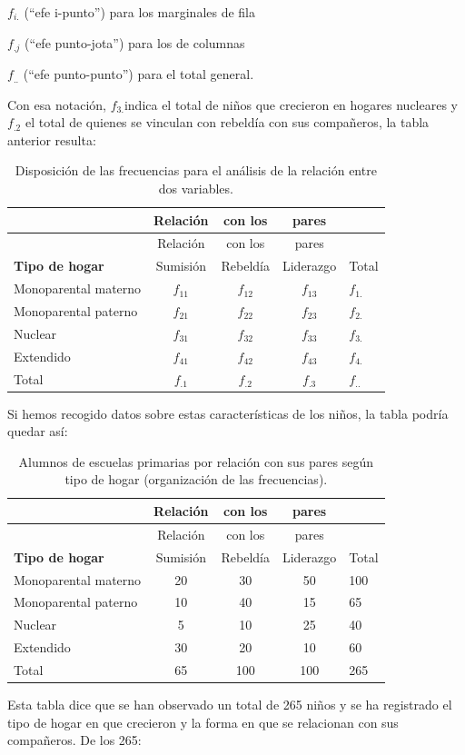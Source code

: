 \documentclass[]{book}
\begin{document}
\(f_{i.}\) (``efe i-punto'') para los marginales de fila

\(f_{.j}\) (``efe punto-jota'') para los de columnas

\(f_{..}\) (``efe punto-punto'') para el total general.

Con esa notación, \(f_{3.}\)indica el total de niños que crecieron en
hogares nucleares y \(f_{.2}\) el total de quienes se vinculan con rebeldía con sus compañeros, la tabla anterior resulta:

\begin{longtable}[]{@{}lcccl@{}}
\caption{\label{tab:unnamed-chunk-122}Disposición de las frecuencias para el análisis de la relación entre dos variables.}\tabularnewline
\toprule
& Relación & con los & pares &\tabularnewline
\midrule
\endfirsthead
\toprule
& Relación & con los & pares &\tabularnewline
\midrule
\endhead
\textbf{Tipo de hogar} & Sumisión & Rebeldía & Liderazgo & Total\tabularnewline
Monoparental materno & \(f_{11}\) & \(f_{12}\) & \(f_{13}\) & \(f_{1.}\)\tabularnewline
Monoparental paterno & \(f_{21}\) & \(f_{22}\) & \(f_{23}\) & \(f_{2.}\)\tabularnewline
Nuclear & \(f_{31}\) & \(f_{32}\) & \(f_{33}\) & \(f_{3.}\)\tabularnewline
Extendido & \(f_{41}\) & \(f_{42}\) & \(f_{43}\) & \(f_{4.}\)\tabularnewline
Total & \(f_{.1}\) & \(f_{.2}\) & \(f_{.3}\) & \(f_{..}\)\tabularnewline
\bottomrule
\end{longtable}

Si hemos recogido datos sobre estas características de los niños, la
tabla podría quedar así:

\begin{longtable}[]{@{}lcccl@{}}
\caption{\label{tab:unnamed-chunk-123}Alumnos de escuelas primarias por relación con sus pares según tipo de hogar (organización de las frecuencias).}\tabularnewline
\toprule
& Relación & con los & pares &\tabularnewline
\midrule
\endfirsthead
\toprule
& Relación & con los & pares &\tabularnewline
\midrule
\endhead
\textbf{Tipo de hogar} & Sumisión & Rebeldía & Liderazgo & Total\tabularnewline
Monoparental materno & 20 & 30 & 50 & 100\tabularnewline
Monoparental paterno & 10 & 40 & 15 & 65\tabularnewline
Nuclear & 5 & 10 & 25 & 40\tabularnewline
Extendido & 30 & 20 & 10 & 60\tabularnewline
Total & 65 & 100 & 100 & 265\tabularnewline
\bottomrule
\end{longtable}

Esta tabla dice que se han observado un total de 265 niños y se ha
registrado el tipo de hogar en que crecieron y la forma en que se
relacionan con sus compañeros. De los 265:
\end{document}
